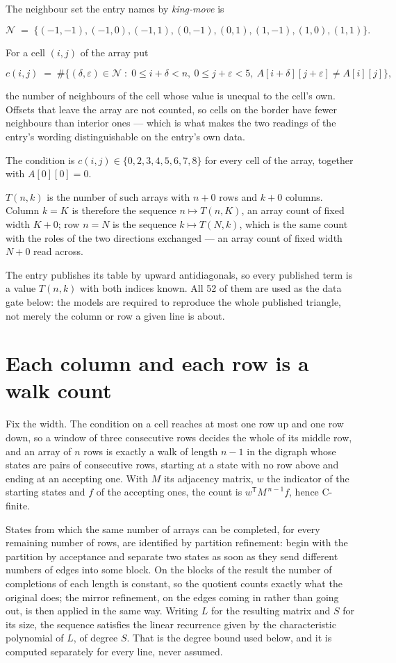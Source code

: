 \documentclass[11pt]{article}
\theoremstyle{definition}
\begin{document}
The neighbour set the entry names by {\itshape king-move} is

\[\mathcal{N} \;=\; \{(-1,-1), (-1,0), (-1,1), (0,-1), (0,1), (1,-1), (1,0), (1,1)\}.\]

For a cell $(i,j)$ of the array put

\[c(i,j) \;=\; \#\bigl\{(\delta,\varepsilon)\in\mathcal{N} \;:\; 0\le i+\delta<n,\ 0\le j+\varepsilon<5,\ A[i+\delta][j+\varepsilon] \neq A[i][j]\bigr\},\]

the number of neighbours of the cell whose value is unequal to the cell's own. Offsets that leave the array are not counted, so cells on the border have fewer neighbours than interior ones --- which is what makes the two readings of the entry's wording distinguishable on the entry's own data.

The condition is $c(i,j) \in \{0, 2, 3, 4, 5, 6, 7, 8\}$ for every cell of the array, together with $A[0][0]=0$.

$T(n,k)$ is the number of such arrays with $n + 0$ rows and $k + 0$ columns. Column $k = K$ is therefore the sequence $n \mapsto T(n,K)$, an array count of fixed width $K + 0$; row $n = N$ is the sequence $k \mapsto T(N,k)$, which is the same count with the roles of the two directions exchanged --- an array count of fixed width $N + 0$ read across.

The entry publishes its table by upward antidiagonals, so every published term is a value $T(n,k)$ with both indices known. All 52 of them are used as the data gate below: the models are required to reproduce the whole published triangle, not merely the column or row a given line is about.

\section{Each column and each row is a walk count}

Fix the width. The condition on a cell reaches at most one row up and one row down, so a window of three consecutive rows decides the whole of its middle row, and an array of $n$ rows is exactly a walk of length $n-1$ in the digraph whose states are pairs of consecutive rows, starting at a state with no row above and ending at an accepting one. With $M$ its adjacency matrix, $w$ the indicator of the starting states and $f$ of the accepting ones, the count is $w^{\mathsf T}M^{\,n-1}f$, hence C-finite.

States from which the same number of arrays can be completed, for every remaining number of rows, are identified by partition refinement: begin with the partition by acceptance and separate two states as soon as they send different numbers of edges into some block. On the blocks of the result the number of completions of each length is constant, so the quotient counts exactly what the original does; the mirror refinement, on the edges coming in rather than going out, is then applied in the same way. Writing $L$ for the resulting matrix and $S$ for its size, the sequence satisfies the linear recurrence given by the characteristic polynomial of $L$, of degree $S$. That is the degree bound used below, and it is computed separately for every line, never assumed.
\end{document}
